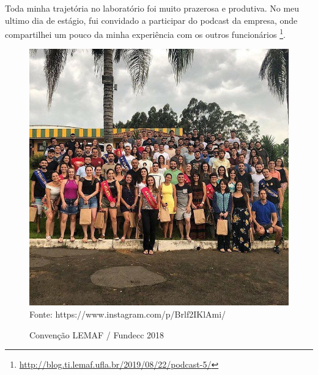 Toda minha trajetória no laboratório foi muito prazerosa e produtiva. No meu ultimo dia de estágio, fui convidado a participar do podcast da empresa, onde compartilhei um pouco da minha experiência com os outros funcionários \footnote{\url{http://blog.ti.lemaf.ufla.br/2019/08/22/podcast-5/}}.

\begin{figure}[H]
\centering
\caption{Convenção LEMAF / Fundecc 2018} %
\includegraphics[scale=0.5]{convensao}\\  %
{\small Fonte: https://www.instagram.com/p/Brlf2IKlAmi/} %
\label{fig:exemplo} %
\end{figure}
    